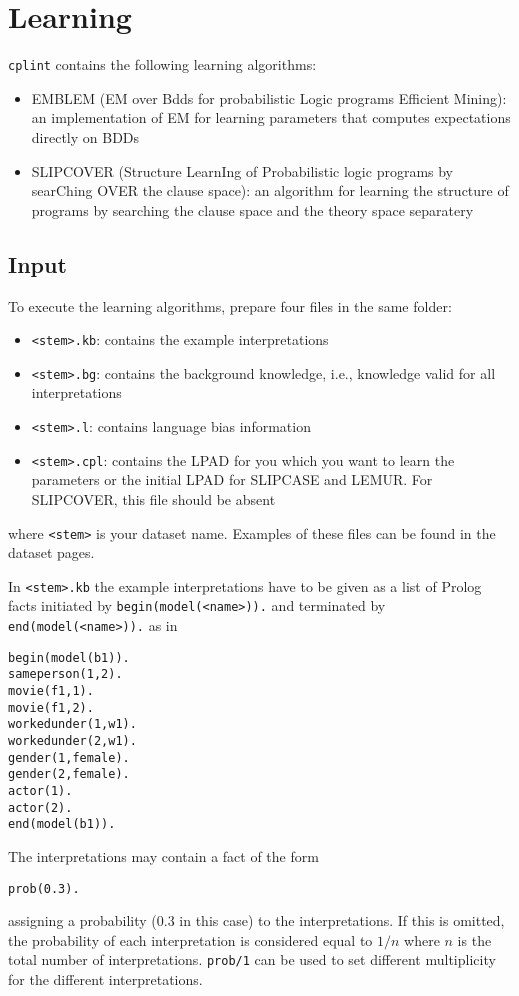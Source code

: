\documentclass[a4paper,10pt]{article}
\begin{document}
\section{Learning}
\texttt{cplint} contains the following learning algorithms:
\begin{itemize}
\item EMBLEM (EM over Bdds for probabilistic Logic programs Efficient Mining): an implementation of EM for learning parameters that computes expectations directly on BDDs \cite{BelRig11-IDA,BelRig11-CILC11-NC,BelRig11-TR}
\item SLIPCOVER (Structure LearnIng of Probabilistic logic programs by searChing OVER the clause space): an algorithm for learning the structure of programs by searching the clause space and the theory space separatery \cite{BelRig13-TPLP-IJ}
\end{itemize}

\subsection{Input}
To execute the learning algorithms, prepare four files in the same folder: 
\begin{itemize}
\item \texttt{<stem>.kb}: contains the example interpretations 
\item \texttt{<stem>.bg}: contains the background knowledge, i.e., knowledge valid for all interpretations
\item \texttt{<stem>.l}: contains language bias information
\item \texttt{<stem>.cpl}: contains the LPAD for you which you want to learn the parameters or the initial LPAD for SLIPCASE and LEMUR. For SLIPCOVER, this file should be absent
\end{itemize}
where \texttt{<stem>} is your dataset name. Examples of these files can be found in the dataset pages.

In \texttt{<stem>.kb} the example interpretations have to be given as a list of Prolog facts initiated by 
\texttt{begin(model(<name>)).} and terminated by \texttt{end(model(<name>)).} as in
\begin{verbatim}
begin(model(b1)).
sameperson(1,2).
movie(f1,1).
movie(f1,2).
workedunder(1,w1).
workedunder(2,w1).
gender(1,female).
gender(2,female).
actor(1).
actor(2).
end(model(b1)).
\end{verbatim}
The interpretations may contain a fact of the form
\begin{verbatim}
prob(0.3).
\end{verbatim}
assigning a probability (0.3 in this case) to the interpretations. If this is omitted, the probability of each interpretation is considered equal to $1/n$ where $n$ is the total number of interpretations. \verb|prob/1| can be used to set different multiplicity for the different interpretations.
\end{document}
